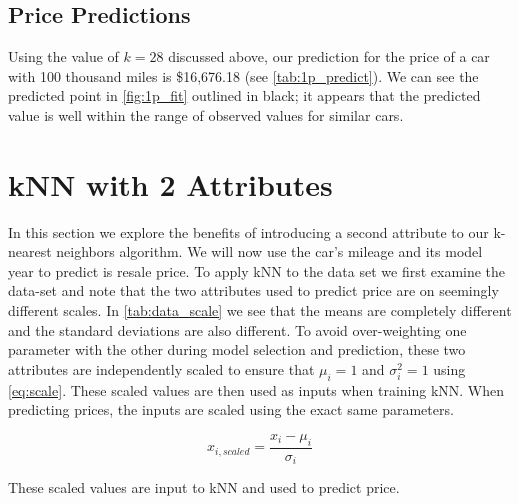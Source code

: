 \documentclass[11pt, fleqn]{article}
\begin{document}
\subsection{Price Predictions}

Using the value of $k=28$ discussed above, our prediction for the price of a car with 100 thousand miles is \$16,676.18 (see \cref{tab:1p_predict}). We can see the predicted point in \cref{fig:1p_fit} outlined in black; it appears that the predicted value is well within the range of observed values for similar cars.



\section{kNN with 2 Attributes}

In this section we explore the benefits of introducing a second attribute to our k-nearest neighbors algorithm. We will now use the car's mileage and its model year to predict is resale price.  To apply kNN to the data set we first examine the data-set and note that the two attributes used to predict price are on seemingly different scales.  In \cref{tab:data_scale} we see that the means are completely different and the standard deviations are also different. To avoid over-weighting one parameter with the other during model selection and prediction, these two attributes are independently scaled to ensure that $\mu_i=1$ and $\sigma_i^2=1$ using \cref{eq:scale}.  These scaled values are then used as inputs when training kNN.  When predicting prices, the inputs are scaled using the exact same parameters.

\begin{equation}\label{eq:scale}
x_{i,scaled} = \frac{x_i-\mu_i}{\sigma_i} 
\end{equation}

These scaled values are input to kNN and used to predict price.

% 

\end{document}
